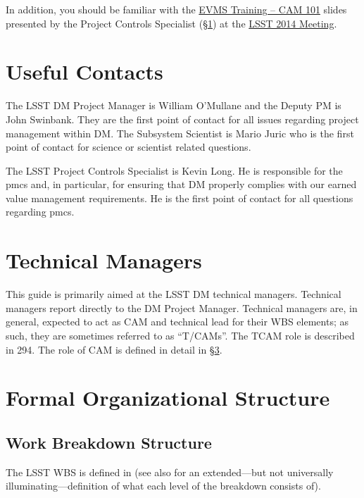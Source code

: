 In addition, you should be familiar with the \href{https://project.lsst.org/meetings/lsst2014/node/100}{EVMS Training -- CAM 101} slides presented by the Project Controls Specialist (\S\ref{sec:contacts}) at the \href{https://project.lsst.org/meetings/lsst2014/}{LSST 2014 Meeting}.

\section{Useful Contacts}
\label{sec:contacts}

The LSST DM Project Manager is William O'Mullane and the Deputy PM is John Swinbank.
They are the first point of contact for all issues regarding project management within DM.
The Subsystem Scientist is Mario Juric who is the first point of contact for science or scientist related questions.

The LSST Project Controls Specialist is Kevin Long.
He is responsible for the \gls{pmcs} and, in particular, for ensuring that DM properly complies with our earned value management requirements.
He is the first point of contact for all questions regarding \gls{pmcs}.

\section{Technical Managers}
\label{sec:tcam}

This guide is primarily aimed at the LSST DM technical managers.
Technical managers report directly to the DM Project Manager. Technical
managers are, in general, expected to act as CAM and technical lead for
their WBS elements; as such, they are sometimes referred to as
``T/CAMs''. The TCAM role is described in 294. The role of CAM is
defined in detail in \S\ref{sec:structure}.

\section{Formal Organizational Structure}
\label{sec:structure}

\subsection{Work Breakdown Structure}
\label{sec:wbs}

The LSST WBS is defined in  (see also  for an extended---but not universally illuminating---definition of what each level of the breakdown consists of).

